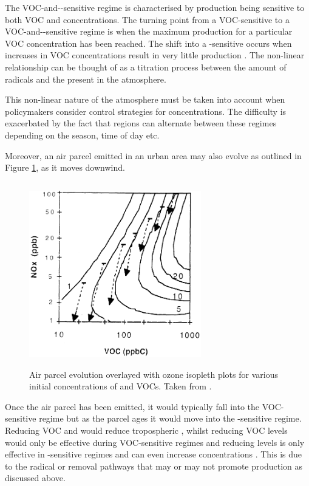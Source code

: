 The VOC-and--sensitive regime is characterised by  production being sensitive to both VOC and  
concentrations. The turning point from a VOC-sensitive to a VOC-and--sensitive regime is when the maximum  
production for a particular VOC concentration has been reached. The shift into a -sensitive occurs when increases in 
VOC concentrations result in very little  production \citep{Kirchner:2001}. The non-linear relationship can be thought of
as a titration process between the amount of radicals and the  present in the atmosphere.

This non-linear nature of the atmosphere must be taken into account when policymakers consider control strategies for  
concentrations. The difficulty is exacerbated by the fact that regions can alternate between these regimes depending on the 
season, time of day etc. 

Moreover, an air parcel emitted in an urban area may also evolve as outlined in Figure \ref{f:air_parcel}, as it moves 
downwind. 
\begin{figure}[ht]
	\begin{center}
		\includegraphics[height=80mm, width=75mm]{../img/air_parcel.png}
		\caption{Air parcel evolution overlayed with ozone isopleth plots for various initial concentrations of  and VOCs. Taken from \citep{Sillman:1999}.}
		\label{f:air_parcel}
	\end{center}
\end{figure}
Once the air parcel has been emitted, it would typically fall into the VOC-sensitive regime but as the parcel ages it would 
move into the -sensitive regime. Reducing VOC and  would reduce tropospheric , whilst reducing VOC 
levels would only be effective during VOC-sensitive regimes and reducing  levels is only effective in 
-sensitive regimes and can even increase  concentrations \citep{Sillman:1999}. This is due to the radical or 
 removal pathways that may or may not promote  production as discussed above.

